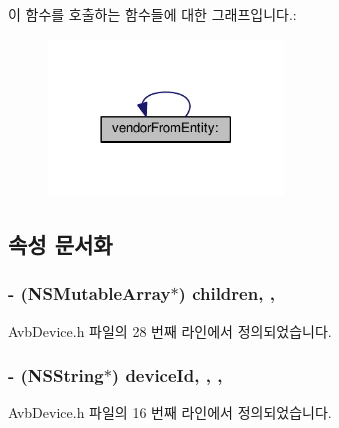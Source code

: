 이 함수를 호출하는 함수들에 대한 그래프입니다.\+:
\nopagebreak
\begin{figure}[H]
\begin{center}
\leavevmode
\includegraphics[width=177pt]{interface_avb_device_a2e2d550fa19e94c61be8e94ae528bc46_icgraph}
\end{center}
\end{figure}




\subsection{속성 문서화}
\subsubsection[{\texorpdfstring{children}{children}}]{\setlength{\rightskip}{0pt plus 5cm}-\/ (N\+S\+Mutable\+Array$\ast$) children\hspace{0.3cm}{\ttfamily [read]}, {\ttfamily [atomic]}, {\ttfamily [copy]}}\hypertarget{interface_avb_device_a4287700a92cc0e6c456a71b2b95eae44}{}\label{interface_avb_device_a4287700a92cc0e6c456a71b2b95eae44}


Avb\+Device.\+h 파일의 28 번째 라인에서 정의되었습니다.

\subsubsection[{\texorpdfstring{device\+Id}{deviceId}}]{\setlength{\rightskip}{0pt plus 5cm}-\/ (N\+S\+String$\ast$) device\+Id\hspace{0.3cm}{\ttfamily [read]}, {\ttfamily [write]}, {\ttfamily [atomic]}, {\ttfamily [copy]}}\hypertarget{interface_avb_device_ac90ae5b4cfd257c5ae22c3d4cce30dc4}{}\label{interface_avb_device_ac90ae5b4cfd257c5ae22c3d4cce30dc4}


Avb\+Device.\+h 파일의 16 번째 라인에서 정의되었습니다.

